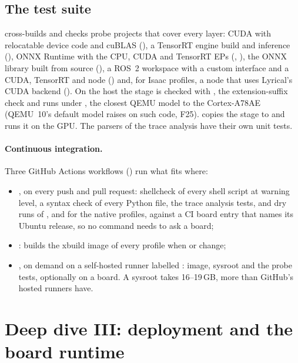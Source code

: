 \documentclass[11pt,a4paper]{article}
\newcommand{\finding}[1]{\textsf{\small F#1}}
\begin{document}
\subsection{The test suite}
 cross-builds and checks probe projects that cover every layer: CUDA with relocatable device code and
cuBLAS (), a TensorRT engine build and inference (), ONNX Runtime with the CPU, CUDA
and TensorRT EPs (, ), the ONNX library built from source (), a ROS~2
workspace with a custom interface and a CUDA, TensorRT and  node () and, for Isaac
profiles, a node that uses Lyrical's  CUDA backend (). On the host the stage is
checked with , the extension-suffix check and runs under , the
closest QEMU model to the Cortex-A78AE (QEMU~10's default model raises  on such code, \finding{25}).
 copies the stage to  and runs it on the GPU. The parsers of the
trace analysis have their own unit tests.

\paragraph{Continuous integration.} Three GitHub Actions workflows () run what fits where:
\begin{itemize}
  \item {}, on every push and pull request: shellcheck of every shell script at warning level, a syntax
        check of every Python file, the trace analysis tests, and dry runs of , 
        and  for the native profiles, against a CI board entry that names its Ubuntu release, so
        no command needs to ask a board;
  \item {}: builds the xbuild image of every profile when  or  change;
  \item {}, on demand on a self-hosted runner labelled : image, sysroot and the probe tests,
        optionally on a board. A sysroot takes 16--19\,GB, more than GitHub's hosted runners have.
\end{itemize}

\section{Deep dive III: deployment and the board runtime}\label{sec:deploy}
\end{document}

